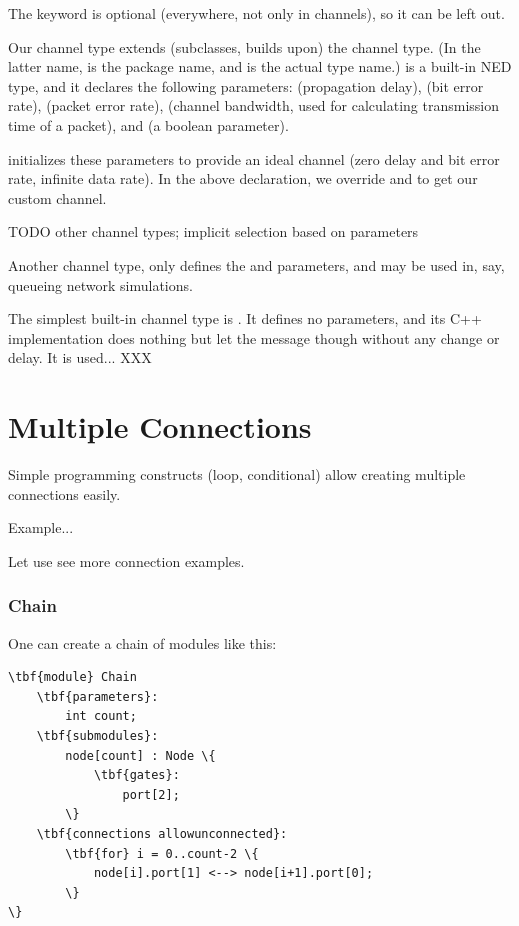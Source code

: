 \begin{note}
    The  keyword is optional (everywhere, not only in
    channels), so it can be left out.
\end{note}

Our  channel type extends (subclasses, builds upon) the
 channel type. (In the latter name,  is the
package name, and  is the actual type name.)
 is a built-in NED type, and it declares the
following parameters:  (propagation delay),  (bit error rate),
 (packet error rate),  (channel bandwidth, used for
calculating transmission time of a packet), and  (a boolean parameter).

 initializes these parameters to provide an ideal channel
(zero delay and bit error rate, infinite data rate). In the above
declaration, we override  and  to get our custom
channel.

TODO other channel types; implicit selection based on parameters

Another channel type,  only defines the 
and  parameters, and may be used in, say, queueing
network simulations.

The simplest built-in channel type is .
It defines no parameters, and its C++ implementation
does nothing but let the message though without any change or delay.
It is used... XXX




\section{Multiple Connections}

Simple programming constructs (loop, conditional) allow creating
multiple connections easily.

Example...

Let use see more connection examples.

\subsubsection{Chain}

One can create a chain of modules like this:

\begin{Verbatim}[commandchars=\\\{\}]
\tbf{module} Chain
    \tbf{parameters}:
        int count;
    \tbf{submodules}:
        node[count] : Node \{
            \tbf{gates}:
                port[2];
        \}
    \tbf{connections allowunconnected}:
        \tbf{for} i = 0..count-2 \{
            node[i].port[1] <--> node[i+1].port[0];
        \}
\}
\end{Verbatim}


